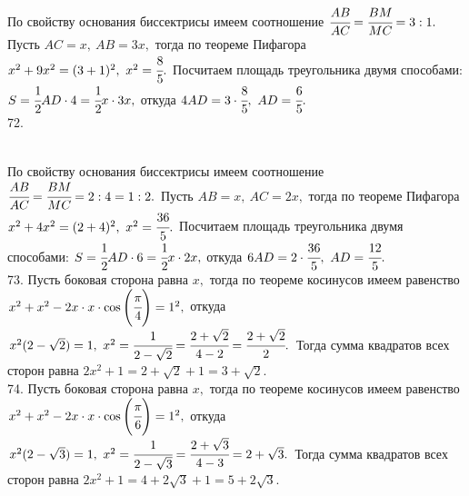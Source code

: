 \documentclass[12pt]{article}
\begin{document}
По свойству основания биссектрисы имеем соотношение $\cfrac{AB}{AC}=\cfrac{BM}{MC}=3:1.$ Пусть $AC=x,\ AB=3x,$ тогда по теореме Пифагора $x^2+9x^2=(3+1)^2,\ x^2=\cfrac{8}{5}.$ Посчитаем площадь треугольника двумя способами: $S=\cfrac{1}{2}AD\cdot4=\cfrac{1}{2}x\cdot3x,$ откуда $4AD=3\cdot\cfrac{8}{5},\ AD=\cfrac{6}{5}.$\\
72. \begin{figure}[ht!]
\end{figure}\\
По свойству основания биссектрисы имеем соотношение $\cfrac{AB}{AC}=\cfrac{BM}{MC}=2:4=1:2.$ Пусть $AB=x,\ AC=2x,$ тогда по теореме Пифагора $x^2+4x^2=(2+4)^2,\ x^2=\cfrac{36}{5}.$ Посчитаем площадь треугольника двумя способами: $S=\cfrac{1}{2}AD\cdot6=\cfrac{1}{2}x\cdot2x,$ откуда $6AD=2\cdot\cfrac{36}{5},\ AD=\cfrac{12}{5}.$\\
73. Пусть боковая сторона равна $x,$ тогда по теореме косинусов имеем равенство $x^2+x^2-2x\cdot x\cdot \cos\left(\cfrac{\pi}{4}\right)=1^2,$ откуда $x^2(2-\sqrt{2})=1,\ x^2=\cfrac{1}{2-\sqrt{2}}=\cfrac{2+\sqrt{2}}{4-2}=\cfrac{2+\sqrt{2}}{2}.$ Тогда сумма квадратов всех сторон равна $2x^2+1=2+\sqrt{2}+1=3+\sqrt{2}.$\\
74. Пусть боковая сторона равна $x,$ тогда по теореме косинусов имеем равенство $x^2+x^2-2x\cdot x\cdot \cos\left(\cfrac{\pi}{6}\right)=1^2,$ откуда $x^2(2-\sqrt{3})=1,\ x^2=\cfrac{1}{2-\sqrt{3}}=\cfrac{2+\sqrt{3}}{4-3}=2+\sqrt{3}.$ Тогда сумма квадратов всех сторон равна $2x^2+1=4+2\sqrt{3}+1=5+2\sqrt{3}.$\\
\end{document}
